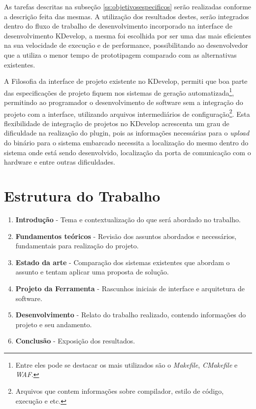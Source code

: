 As tarefas descritas na subseção \ref{ss:objetivosespecificos} serão realizadas conforme a descrição feita das mesmas. A utilização dos resultados destes, serão integrados dentro do fluxo de trabalho de desenvolvimento incorporado na interface de desenvolvimento KDevelop, a mesma foi escolhida por ser uma das mais eficientes na sua velocidade de execução e de performance, possibilitando ao desenvolvedor que a utiliza o menor tempo de prototipagem comparado com as alternativas existentes.

A Filosofia da interface de projeto existente no KDevelop, permiti que boa parte das especificações de projeto fiquem nos sistemas de geração automatizada\footnote{Entre eles pode se destacar os mais utilizados são o \textit{Makefile}, \textit{CMakefile} e \textit{WAF}.}, permitindo ao programador o desenvolvimento de software sem a integração do projeto com a interface, utilizando arquivos intermediários de configuração\footnote{Arquivos que contem informações sobre compilador, estilo de código, execução e etc.}. Esta flexibilidade de integração de projetos no KDevelop acrescenta um grau de dificuldade na realização do plugin, pois as informações necessárias para o \textit{upload} do binário para o sistema embarcado necessita a localização do mesmo dentro do sistema onde está sendo desenvolvido, localização da porta de comunicação com o hardware e entre outras dificuldades. %

\section{Estrutura do Trabalho}

\begin{enumerate}
\item \textbf{Introdução} - Tema e contextualização do que será abordado no trabalho.
\item \textbf{Fundamentos teóricos} - Revisão dos assuntos abordados e necessários, fundamentais para realização do projeto.
\item \textbf{Estado da arte} - Comparação dos sistemas existentes que abordam o assunto e tentam aplicar uma proposta de solução.
\item \textbf{Projeto da Ferramenta} - Rascunhos iniciais de interface e arquitetura de software.
\item \textbf{Desenvolvimento} - Relato do trabalho realizado, contendo informações do projeto e seu andamento.
\item \textbf{Conclusão} - Exposição dos resultados.
\end{enumerate}
